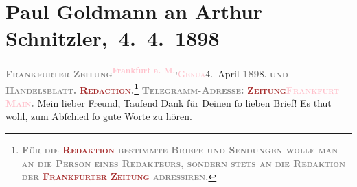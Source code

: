 

               \section[ Paul Goldmann an Arthur Schnitzler, 4. 4. 1898]{Paul Goldmann an Arthur Schnitzler, 4. 4. 1898}\nopagebreak{}\rehead{ }\normalsize\beginnumbering{} \toendnotes[C]{\smallbreak\pagebreak[2]} 
\toendnotes[C]{\smallbreak}\pstart
           \noindent{}{\pb}\textcolor{brown}{\textcolor{gray}{\textbf{\textsc{Frankfurter Zeitung}}}}{}\ledrightnote{\textcolor{brown}{Frankfurter Zeitung}}\hfill \substVorne{}\textsuperscript{\textcolor{gray}{\textbf{\textcolor{pink}{Frankfurt a. M.}{}\ledrightnote{\textcolor{pink}{Frankfurt am Main}},}}}{\allowbreak}\substDazwischen{}\textsc{\textcolor{pink}{Genua}{}\ledrightnote{\textcolor{pink}{Genua}}}\substHinten{}{ }4. April \textcolor{gray}{\textbf{189}}8.\pend
           \pstart
           \textsc{\textcolor{gray}{\textbf{und}}}\pend
           \pstart
           \textcolor{gray}{\textbf{\textsc{Handelsblatt.}}}\pend
           \pstart
           \textcolor{gray}{\textbf{\textsc{\textcolor{brown}{Redaction}{}.\footnote{\noindent{}\textcolor{gray}{\textbf{\textsc{Für die \textcolor{brown}{Redaktion} bestimmte Briefe und Sendungen
                                    wolle man  an die Person eines
                                    Redakteurs, sondern stets \textbf{an die Redaktion der
                                          \textcolor{brown}{Frankfurter Zeitung}} adressiren.}}}}}}}\pend
           \pstart
           \textcolor{gray}{\textbf{\textsc{Telegramm-Adresse:}}}\pend
           \pstart
           \textcolor{gray}{\textbf{\textsc{\textcolor{brown}{Zeitung}{}\textcolor{pink}{Frankfurt Main}{}\ledrightnote{\textcolor{pink}{Frankfurt am Main}}.}}}\pend
           \pstart{}Mein lieber Freund,\pend\pstart
           Tauſend Dank für Deinen ſo lieben Brief! Es thut wohl, zum Abſchied ſo gute Worte zu
               hören.\pend
           \pstart
